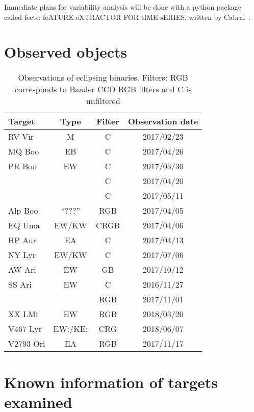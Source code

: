 Immediate plans for variability analysis will be done with a python package 
called feets: feATURE eXTRACTOR FOR tIME sERIES,
written by Cabral~\cite{cabral_2018}. 


\section{Observed objects}
\begin{table}
    \centering
    \begin{tabular}[h]{l c c c}
    \toprule
    Target      & Type  & Filter    & Observation date \\ \bottomrule
    RV Vir      & M     & C         & 2017/02/23 \\ \midrule
    MQ Boo      & EB    & C         & 2017/04/26 \\ \midrule
    PR Boo      & EW    & C         & 2017/03/30 \\ \midrule
                &       & C         & 2017/04/20 \\ \midrule
                &       & C         & 2017/05/11 \\ \midrule
    Alp Boo     & ``???''   & RGB       & 2017/04/05 \\ \midrule
    EQ Uma      & EW/KW & CRGB      & 2017/04/06 \\ \midrule
    HP Aur      & EA    & C         & 2017/04/13 \\ \midrule
    NY Lyr      & EW/KW & C         & 2017/07/06 \\ \midrule
    AW Ari      & EW    & GB        & 2017/10/12 \\ \midrule
    SS Ari      & EW    & C         & 2016/11/27 \\ \midrule
                &       & RGB       & 2017/11/01 \\ \midrule
    XX LMi      & EW    & RGB       & 2018/03/20 \\ \midrule
    V467 Lyr    & EW:/KE:& CRG   & 2018/06/07 \\ \midrule
    V2793 Ori   & EA    & RGB   & 2017/11/17 \\
    \bottomrule
    \end{tabular}
    \caption{Observations of eclipsing binaries. Filters: RGB corresponds to Baader CCD RGB filters and C is unfiltered}\label{tab:observations}
\end{table}
\section{Known information of targets examined}

